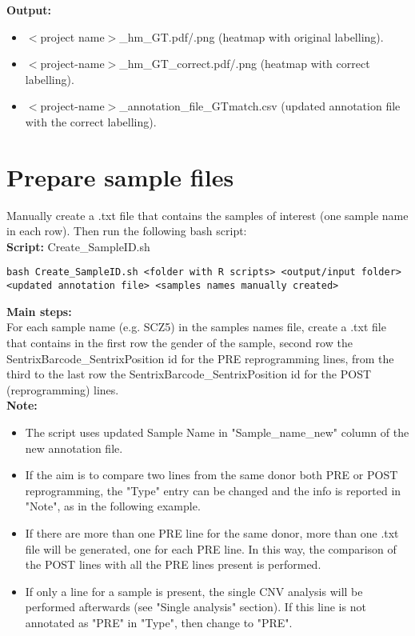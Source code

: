 \documentclass[11pt]{paper}
\begin{document}
\textbf{Output:}
\begin{itemize}
\item $<$project name$>$\_hm\_GT.pdf/.png (heatmap with original labelling).
\item $<$project-name$>$\_hm\_GT\_correct.pdf/.png (heatmap with correct labelling).
\item $<$project-name$>$\_annotation\_file\_GTmatch.csv (updated annotation file with the correct labelling).
\end{itemize}


\section{Prepare sample files}
Manually create a .txt file that contains the samples of interest (one sample name in each row). Then run the following bash script:\\
\textbf{Script:} Create\_SampleID.sh
\begin{verbatim}
bash Create_SampleID.sh <folder with R scripts> <output/input folder> 
<updated annotation file> <samples names manually created>
\end{verbatim}
\textbf{Main steps:}\\
For each sample name (e.g. SCZ5) in the samples names file, create a .txt file that contains in the first row the gender of the sample, second row the SentrixBarcode\_SentrixPosition id for the PRE reprogramming lines, from the third to the last row the SentrixBarcode\_SentrixPosition id for the POST (reprogramming) lines.\\
\textbf{Note:}
\begin{itemize}
\item The script uses updated Sample Name in "Sample\_name\_new" column of the new annotation file.
\item If the aim is to compare two lines from the same donor both PRE or POST reprogramming, the "Type" entry can be changed and the info is reported in "Note", as in the following example.
\begin{table}[!h]
\end{table}
\item If there are more than one PRE line for the same donor, more than one .txt file will be generated, one for each PRE line. In this way, the comparison of the POST lines with all the PRE lines present is performed. 
\item If only a line for a sample is present, the single CNV analysis will be performed afterwards (see  "Single analysis" section). If this line is not annotated as "PRE" in "Type", then change to "PRE".
\end{itemize}
\end{document}
